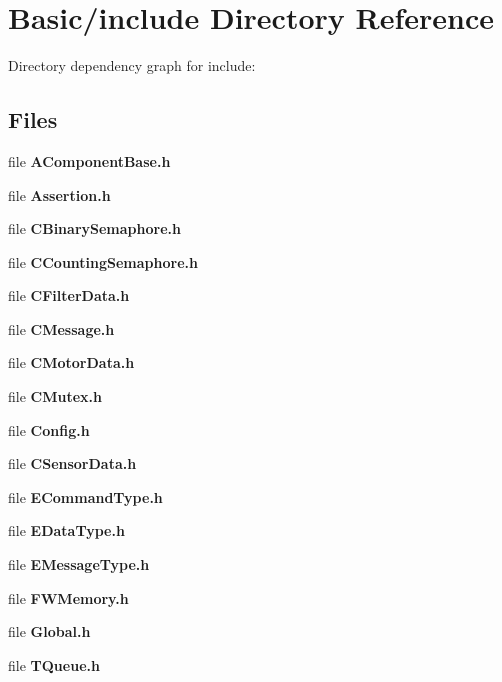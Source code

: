 \section{Basic/include Directory Reference}
\label{dir_cef03ca4a69ff518f9b4d1dedd2b39ef}
Directory dependency graph for include\-:
\subsection*{Files}
\begin{DoxyCompactItemize}
\item 
file {\bf A\-Component\-Base.\-h}
\item 
file {\bf Assertion.\-h}
\item 
file {\bf C\-Binary\-Semaphore.\-h}
\item 
file {\bf C\-Counting\-Semaphore.\-h}
\item 
file {\bf C\-Filter\-Data.\-h}
\item 
file {\bf C\-Message.\-h}
\item 
file {\bf C\-Motor\-Data.\-h}
\item 
file {\bf C\-Mutex.\-h}
\item 
file {\bf Config.\-h}
\item 
file {\bf C\-Sensor\-Data.\-h}
\item 
file {\bf E\-Command\-Type.\-h}
\item 
file {\bf E\-Data\-Type.\-h}
\item 
file {\bf E\-Message\-Type.\-h}
\item 
file {\bf F\-W\-Memory.\-h}
\item 
file {\bf Global.\-h}
\item 
file {\bf T\-Queue.\-h}
\end{DoxyCompactItemize}
